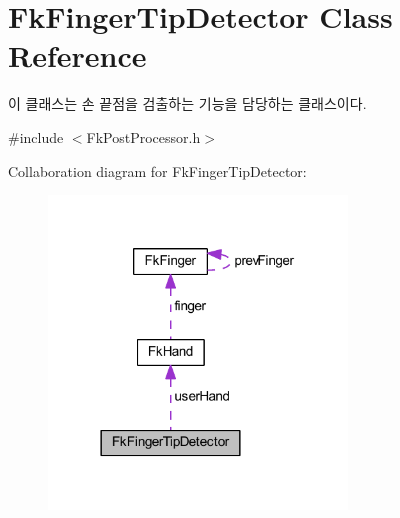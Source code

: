 \hypertarget{class_fk_finger_tip_detector}{}\section{Fk\+Finger\+Tip\+Detector Class Reference}
\label{class_fk_finger_tip_detector}


이 클래스는 손 끝점을 검출하는 기능을 담당하는 클래스이다.  




{\ttfamily \#include $<$Fk\+Post\+Processor.\+h$>$}



Collaboration diagram for Fk\+Finger\+Tip\+Detector\+:
\nopagebreak
\begin{figure}[H]
\begin{center}
\leavevmode
\includegraphics[width=225pt]{class_fk_finger_tip_detector__coll__graph}
\end{center}
\end{figure}
